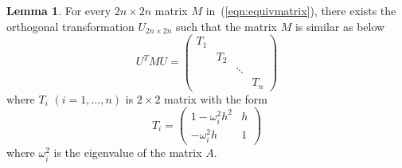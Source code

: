 \documentclass[11pt,fceqn]{article}
\numberwithin{equation}{section}
\theoremstyle{definition}
\newtheorem{lem}[thm]{Lemma}
\begin{document}
\begin{lem}
\label{lem:symmetric}
For every $2n\times 2n$ matrix $M$ in~(\ref{eqn:equivmatrix}), there exists the orthogonal transformation $U_{2n\times 2n}$ such that the matrix $M$ is similar as below
\begin{equation}
\label{eqn:equiveigen}
U^{T}MU = \begin{pmatrix} T_{1} & & & \\ &T_{2} & & \\ & &\ddots & \\ & & & T_{n} \end{pmatrix} 
\end{equation}
where $T_{i}$ $(i=1,\ldots, n)$ is $2\times 2$ matrix with the form 
\begin{equation}
\label{eqn:2by2}
T_{i} = \begin{pmatrix}
        1-\omega_{i}^{2}h^{2} & h \\
        -\omega_{i}^{2}h      & 1
        \end{pmatrix}
\end{equation}
where $\omega_{i}^{2}$ is the eigenvalue of the matrix $A$.
\end{lem}
\end{document}
